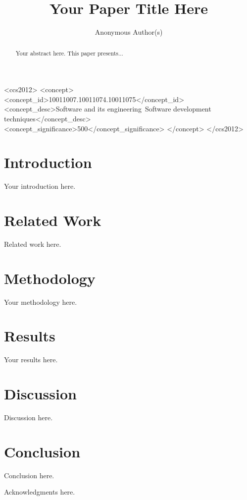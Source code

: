 \documentclass[sigconf, anonymous, review]{acmart}
\begin{document}
\title{Your Paper Title Here}

\author{Anonymous Author(s)}

\begin{abstract}
Your abstract here. This paper presents...
\end{abstract}

\begin{CCSXML}
<ccs2012>
 <concept>
  <concept_id>10011007.10011074.10011075</concept_id>
  <concept_desc>Software and its engineering~Software development techniques</concept_desc>
  <concept_significance>500</concept_significance>
 </concept>
</ccs2012>
\end{CCSXML}


\maketitle

\section{Introduction}
Your introduction here.

\section{Related Work}
Related work here.

\section{Methodology}
Your methodology here.

\section{Results}
Your results here.

\section{Discussion}
Discussion here.

\section{Conclusion}
Conclusion here.

\begin{acks}
Acknowledgments here.
\end{acks}



\end{document}
